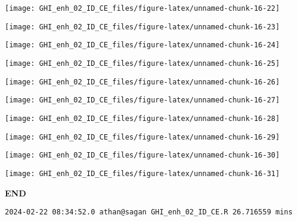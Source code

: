 \documentclass[
  10pt,
  a4paper,oneside]{article}
\begin{document}
\begin{center}\texttt{[image: GHI\_enh\_02\_ID\_CE\_files/figure-latex/unnamed-chunk-16-22]} \end{center}

\begin{center}\texttt{[image: GHI\_enh\_02\_ID\_CE\_files/figure-latex/unnamed-chunk-16-23]} \end{center}

\begin{center}\texttt{[image: GHI\_enh\_02\_ID\_CE\_files/figure-latex/unnamed-chunk-16-24]} \end{center}

\begin{center}\texttt{[image: GHI\_enh\_02\_ID\_CE\_files/figure-latex/unnamed-chunk-16-25]} \end{center}

\begin{center}\texttt{[image: GHI\_enh\_02\_ID\_CE\_files/figure-latex/unnamed-chunk-16-26]} \end{center}

\begin{center}\texttt{[image: GHI\_enh\_02\_ID\_CE\_files/figure-latex/unnamed-chunk-16-27]} \end{center}

\begin{center}\texttt{[image: GHI\_enh\_02\_ID\_CE\_files/figure-latex/unnamed-chunk-16-28]} \end{center}

\begin{center}\texttt{[image: GHI\_enh\_02\_ID\_CE\_files/figure-latex/unnamed-chunk-16-29]} \end{center}

\begin{center}\texttt{[image: GHI\_enh\_02\_ID\_CE\_files/figure-latex/unnamed-chunk-16-30]} \end{center}

\begin{center}\texttt{[image: GHI\_enh\_02\_ID\_CE\_files/figure-latex/unnamed-chunk-16-31]} \end{center}

\textbf{END}

\begin{verbatim}
2024-02-22 08:34:52.0 athan@sagan GHI_enh_02_ID_CE.R 26.716559 mins
\end{verbatim}
\end{document}
